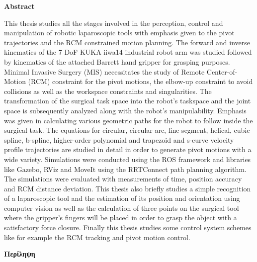 \pagestyle{empty}
{\textbf{Abstract}\\[1cm]}

This thesis studies all the stages involved in the perception, control and manipulation of robotic laparoscopic tools with emphasis given to the pivot trajectories and the RCM constrained motion planning. The forward and inverse kinematics of the 7 DoF KUKA iiwa14 industrial robot arm was studied  followed by kinematics of the attached Barrett hand gripper for grasping purposes. Minimal Invasive Surgery (MIS) necessitates the study of Remote Center-of-Motion (RCM)  constraint for the pivot motions, the elbow-up constraint to avoid collisions as well as the workspace constraints and singularities. The transformation of the surgical task space into the robot’s taskspace and the joint space is subsequently analyzed along with the robot's manipulability. Emphasis was given in calculating various geometric paths for the robot to follow inside the surgical task. The equations for circular, circular arc, line segment, helical, cubic spline, b-spline, higher-order polynomial and trapezoid and s-curve velocity profile trajectories are studied in detail in order to generate pivot motions with a wide variety. Simulations were conducted using the ROS framework and libraries like Gazebo, RViz and MoveIt using the RRTConnect path planning algorithm. The simulations were evaluated with measurements of time, position accuracy and RCM distance deviation. This thesis also briefly 
studies a simple recognition of a laparoscopic tool and the estimation of its position and orientation using computer vision as well as the calculation of three points on the surgical tool where the gripper’s fingers will be 
placed in order to grasp the object with a satisfactory force closure. Finally this thesis studies some control system schemes like for example the RCM tracking and pivot motion control.

\newpage{\pagestyle{empty}\cleardoublepage}

\newpage
\pagestyle{empty}
{\textbf{Περίληψη}\\[1cm]}

